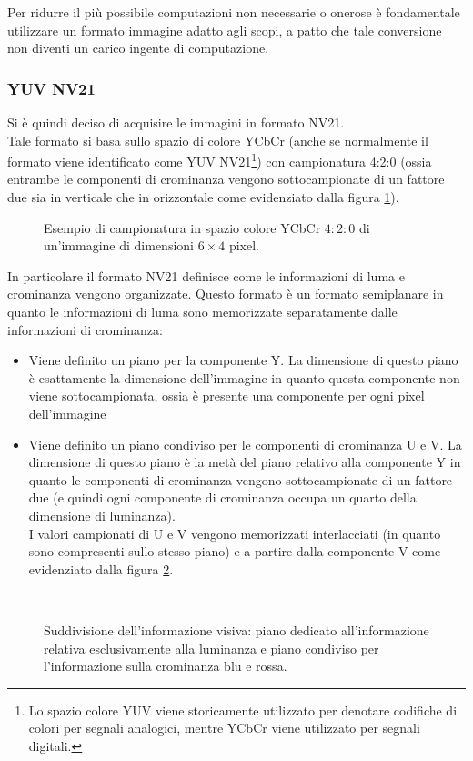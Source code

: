 Per ridurre il più possibile computazioni non necessarie o onerose è fondamentale utilizzare un formato immagine adatto agli scopi, a patto che tale conversione non diventi un carico ingente di computazione.\\

\subsubsection{YUV NV21}
Si è quindi deciso di acquisire le immagini in formato NV21.\\
Tale formato si basa sullo spazio di colore YCbCr (anche se normalmente il formato viene identificato come YUV NV21\footnote{ Lo spazio colore YUV viene storicamente utilizzato per denotare codifiche di colori per segnali analogici, mentre YCbCr viene utilizzato per segnali digitali.}) con campionatura 4:2:0 (ossia entrambe le componenti di crominanza vengono sottocampionate di un fattore due sia in verticale che in orizzontale come evidenziato dalla figura \ref{YUVsampling}).\\
\begin{figure}[!ht]
\begin{center}
\YUVsampling
\end{center}
\caption{Esempio di campionatura in spazio colore YCbCr $4:2:0$ di un'immagine di dimensioni $6×4$ pixel.}
\label{YUVsampling}
\end{figure}

\noindent In particolare il formato NV21 definisce come le informazioni di luma e crominanza vengono organizzate. Questo formato è un formato semiplanare in quanto le informazioni di luma sono memorizzate separatamente dalle informazioni di crominanza: 
\begin{itemize}
  \item Viene definito un piano per la componente Y. La dimensione di questo piano è esattamente la dimensione dell'immagine in quanto questa componente non viene sottocampionata, ossia è presente una componente per ogni pixel dell'immagine
  \item Viene definito un piano condiviso per le componenti di crominanza U e V. La dimensione di questo piano è la metà del piano relativo alla componente Y in quanto le componenti di crominanza vengono sottocampionate di un fattore due (e quindi ogni componente di crominanza occupa un quarto della dimensione di luminanza).\\
  I valori campionati di U e V vengono memorizzati interlacciati (in quanto sono compresenti sullo stesso piano) e a partire dalla componente V come evidenziato dalla figura \ref{YUVplanes}.\\
\end{itemize}
\begin{figure}[!ht]
\begin{center}
~
\end{center}
\caption{Suddivisione dell'informazione visiva: piano dedicato all'informazione relativa esclusivamente alla luminanza e piano condiviso per l'informazione sulla crominanza blu e rossa.}
\label{YUVplanes}
\end{figure}


